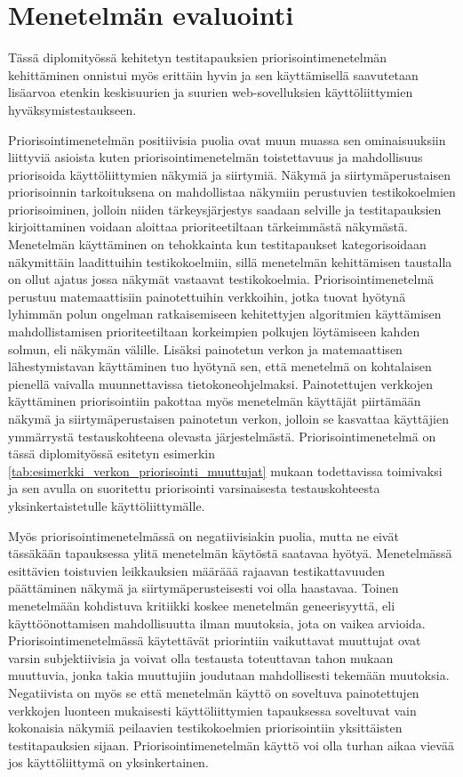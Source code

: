 \section{Menetelmän evaluointi} \label{ch:12_menetelman_evaluointi}

  Tässä diplomityössä kehitetyn testitapauksien priorisointimenetelmän kehittäminen onnistui myös erittäin hyvin ja sen käyttämisellä saavutetaan lisäarvoa etenkin keskisuurien ja suurien web-sovelluksien käyttöliittymien hyväksymistestaukseen.

  Priorisointimenetelmän positiivisia puolia ovat muun muassa sen ominaisuuksiin liittyviä asioista kuten priorisointimenetelmän toistettavuus ja mahdollisuus priorisoida käyttöliittymien näkymiä ja siirtymiä.
  Näkymä ja siirtymäperustaisen priorisoinnin tarkoituksena on mahdollistaa näkymiin perustuvien testikokoelmien priorisoiminen, jolloin niiden tärkeysjärjestys saadaan selville ja testitapauksien kirjoittaminen voidaan aloittaa prioriteetiltaan tärkeimmästä näkymästä.
  Menetelmän käyttäminen on tehokkainta kun testitapaukset kategorisoidaan näkymittäin laadittuihin testikokoelmiin, sillä menetelmän kehittämisen taustalla on ollut ajatus jossa näkymät vastaavat testikokoelmia.
  Priorisointimenetelmä perustuu matemaattisiin painotettuihin verkkoihin, jotka tuovat hyötynä lyhimmän polun ongelman ratkaisemiseen kehitettyjen algoritmien käyttämisen mahdollistamisen prioriteetiltaan korkeimpien polkujen löytämiseen kahden solmun, eli näkymän välille.
  Lisäksi painotetun verkon ja matemaattisen lähestymistavan käyttäminen tuo hyötynä sen, että menetelmä on kohtalaisen pienellä vaivalla muunnettavissa tietokoneohjelmaksi.
  Painotettujen verkkojen käyttäminen priorisointiin pakottaa myös menetelmän käyttäjät piirtämään näkymä ja siirtymäperustaisen painotetun verkon, jolloin se kasvattaa käyttäjien ymmärrystä testauskohteena olevasta järjestelmästä.
  Priorisointimenetelmä on tässä diplomityössä esitetyn esimerkin \ref{tab:esimerkki_verkon_priorisointi_muuttujat} mukaan todettavissa toimivaksi ja sen avulla on suoritettu priorisointi varsinaisesta testauskohteesta yksinkertaistetulle käyttöliittymälle.

  Myös priorisointimenetelmässä on negatiivisiakin puolia, mutta ne eivät tässäkään tapauksessa ylitä menetelmän käytöstä saatavaa hyötyä.
  Menetelmässä esittävien toistuvien leikkauksien määräää rajaavan testikattavuuden päättäminen näkymä ja siirtymäperusteisesti voi olla haastavaa.
  Toinen menetelmään kohdistuva kritiikki koskee menetelmän geneerisyyttä, eli käyttöönottamisen mahdollisuutta ilman muutoksia, jota on vaikea arvioida.
  Priorisointimenetelmässä käytettävät priorintiin vaikuttavat muuttujat ovat varsin subjektiivisia ja voivat olla testausta toteuttavan tahon mukaan muuttuvia, jonka takia muuttujiin joudutaan mahdollisesti tekemään muutoksia.
  Negatiivista on myös se että menetelmän käyttö on soveltuva painotettujen verkkojen luonteen mukaisesti käyttöliittymien tapauksessa soveltuvat vain kokonaisia näkymiä peilaavien testikokoelmien priorisointiin yksittäisten testitapauksien sijaan.
  Priorisointimenetelmän käyttö voi olla turhan aikaa vievää jos käyttöliittymä on yksinkertainen.

